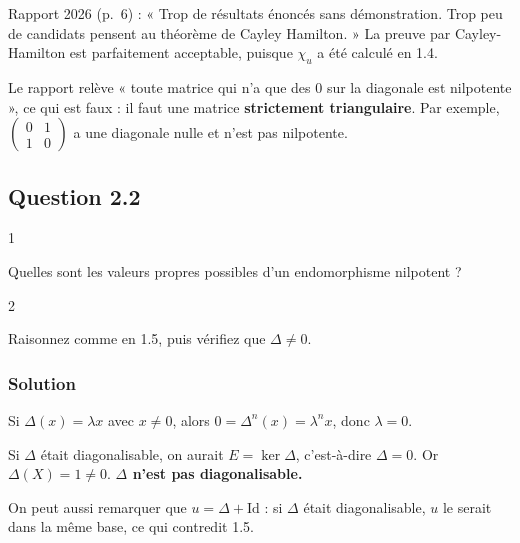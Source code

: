 \documentclass[11pt,a4paper]{article}
\begin{document}
\begin{jury}

Rapport 2026 (p.~6) : « Trop de résultats énoncés sans démonstration. Trop peu de candidats pensent au théorème de Cayley Hamilton. » La preuve par Cayley-Hamilton est parfaitement acceptable, puisque \(\chi_u\) a été calculé en 1.4.

\end{jury}

\begin{piege}

Le rapport relève « toute matrice qui n'a que des \(0\) sur la diagonale est nilpotente », ce qui est faux : il faut une matrice \textbf{strictement triangulaire}. Par exemple, \(\begin{pmatrix}0&1\\1&0\end{pmatrix}\) a une diagonale nulle et n'est pas nilpotente.

\end{piege}

\hypertarget{question-2.2}{%
\subsection{Question 2.2}\label{question-2.2}}

\begin{indication}{1}

Quelles sont les valeurs propres possibles d'un endomorphisme nilpotent ?

\end{indication}

\begin{indication}{2}

Raisonnez comme en 1.5, puis vérifiez que \(\Delta\ne 0\).

\end{indication}

\hypertarget{solution-9}{%
\subsubsection{Solution}\label{solution-9}}

Si \(\Delta(x)=\lambda x\) avec \(x\ne 0\), alors \(0=\Delta^n(x)=\lambda^nx\), donc \(\lambda=0\).

Si \(\Delta\) était diagonalisable, on aurait \(E=\ker\Delta\), c'est-à-dire \(\Delta=0\). Or \(\Delta(X)=1\ne 0\). \textbf{\(\Delta\) n'est pas diagonalisable.}

On peut aussi remarquer que \(u=\Delta+\mathrm{Id}\) : si \(\Delta\) était diagonalisable, \(u\) le serait dans la même base, ce qui contredit 1.5.
\end{document}
